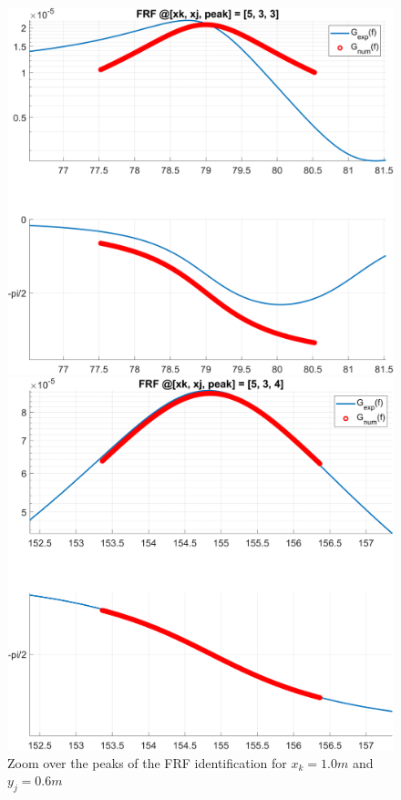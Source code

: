 \begin{figure}[H]
\begin{minipage}[b]{0.45\textwidth}
    \end{minipage}
    \begin{minipage}[b]{0.45\textwidth}
        \centering
        \includegraphics[width=\textwidth]{img/MATLAB/Part_A/Comparison_FRF_couple_3_5_zoom_peak_03.png}
    \end{minipage}
    \hfill
    \begin{minipage}[b]{0.45\textwidth}
        \centering
        \includegraphics[width=\textwidth]{img/MATLAB/Part_A/Comparison_FRF_couple_3_5_zoom_peak_04.png}
    \end{minipage}
    \caption{Zoom over the peaks of the FRF identification for $x_k = 1.0m$ and $y_j = 0.6m$}
    \label{fig:FRF_identification_zoom}
\end{figure}
